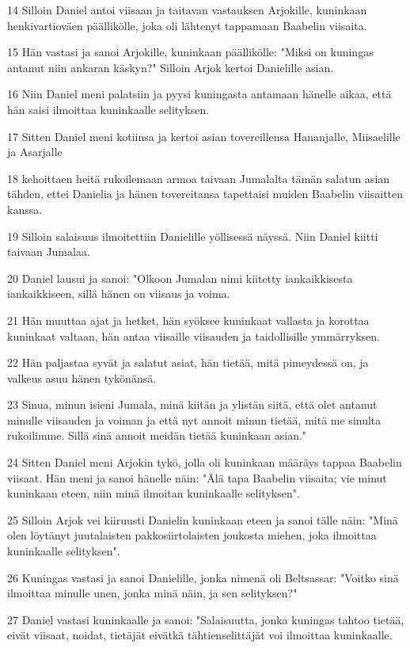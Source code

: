 \par 14 Silloin Daniel antoi viisaan ja taitavan vastauksen Arjokille, kuninkaan henkivartioväen päällikölle, joka oli lähtenyt tappamaan Baabelin viisaita.
\par 15 Hän vastasi ja sanoi Arjokille, kuninkaan päällikölle: "Miksi on kuningas antanut niin ankaran käskyn?" Silloin Arjok kertoi Danielille asian.
\par 16 Niin Daniel meni palatsiin ja pyysi kuningasta antamaan hänelle aikaa, että hän saisi ilmoittaa kuninkaalle selityksen.
\par 17 Sitten Daniel meni kotiinsa ja kertoi asian tovereillensa Hananjalle, Miisaelille ja Asarjalle
\par 18 kehoittaen heitä rukoilemaan armoa taivaan Jumalalta tämän salatun asian tähden, ettei Danielia ja hänen tovereitansa tapettaisi muiden Baabelin viisaitten kanssa.
\par 19 Silloin salaisuus ilmoitettiin Danielille yöllisessä näyssä. Niin Daniel kiitti taivaan Jumalaa.
\par 20 Daniel lausui ja sanoi: "Olkoon Jumalan nimi kiitetty iankaikkisesta iankaikkiseen, sillä hänen on viisaus ja voima.
\par 21 Hän muuttaa ajat ja hetket, hän syöksee kuninkaat vallasta ja korottaa kuninkaat valtaan, hän antaa viisaille viisauden ja taidollisille ymmärryksen.
\par 22 Hän paljastaa syvät ja salatut asiat, hän tietää, mitä pimeydessä on, ja valkeus asuu hänen tykönänsä.
\par 23 Sinua, minun isieni Jumala, minä kiitän ja ylistän siitä, että olet antanut minulle viisauden ja voiman ja että nyt annoit minun tietää, mitä me sinulta rukoilimme. Sillä sinä annoit meidän tietää kuninkaan asian."
\par 24 Sitten Daniel meni Arjokin tykö, jolla oli kuninkaan määräys tappaa Baabelin viisaat. Hän meni ja sanoi hänelle näin: "Älä tapa Baabelin viisaita; vie minut kuninkaan eteen, niin minä ilmoitan kuninkaalle selityksen".
\par 25 Silloin Arjok vei kiiruusti Danielin kuninkaan eteen ja sanoi tälle näin: "Minä olen löytänyt juutalaisten pakkosiirtolaisten joukosta miehen, joka ilmoittaa kuninkaalle selityksen".
\par 26 Kuningas vastasi ja sanoi Danielille, jonka nimenä oli Beltsassar: "Voitko sinä ilmoittaa minulle unen, jonka minä näin, ja sen selityksen?"
\par 27 Daniel vastasi kuninkaalle ja sanoi: "Salaisuutta, jonka kuningas tahtoo tietää, eivät viisaat, noidat, tietäjät eivätkä tähtienselittäjät voi ilmoittaa kuninkaalle.
